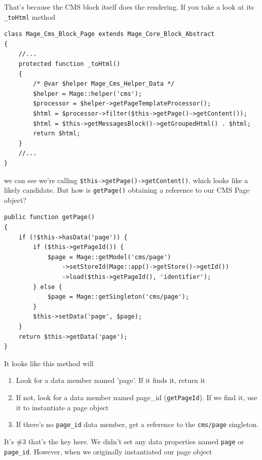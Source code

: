 \documentclass[oneside]{book}
\begin{document}
That's because the CMS block itself does the rendering.  If you take a look at its \footnotesize\texttt{\_toHtml} \normalsize  method

\begin{lstlisting}
class Mage_Cms_Block_Page extends Mage_Core_Block_Abstract
{
    //...
    protected function _toHtml()
    {
        /* @var $helper Mage_Cms_Helper_Data */
        $helper = Mage::helper('cms');
        $processor = $helper->getPageTemplateProcessor();
        $html = $processor->filter($this->getPage()->getContent());
        $html = $this->getMessagesBlock()->getGroupedHtml() . $html;
        return $html;
    }
    //...
}

\end{lstlisting}


we can see we're calling \footnotesize\texttt{\$this-\textgreater getPage()-\textgreater getContent()}\normalsize, which looks like a likely candidate.  But how is \footnotesize\texttt{getPage()} \normalsize  obtaining a reference to our CMS Page object?

\begin{lstlisting}
public function getPage()
{
    if (!$this->hasData('page')) {
        if ($this->getPageId()) {
            $page = Mage::getModel('cms/page')
                ->setStoreId(Mage::app()->getStore()->getId())
                ->load($this->getPageId(), 'identifier');
        } else {
            $page = Mage::getSingleton('cms/page');
        }
        $this->setData('page', $page);
    }
    return $this->getData('page');
}

\end{lstlisting}


It looks like this method will

\begin{enumerate}
\item Look for a data member named 'page'.  If it finds it, return it
\item If not, look for a data member named page\_id (\footnotesize\texttt{getPageId}\normalsize). If we find it, use it to instantiate a page object
\item If there's no \footnotesize\texttt{page\_id} \normalsize  data member, get a reference to the \footnotesize\texttt{cms/page} \normalsize  singleton.
\end{enumerate}


It's \#3 that's the key here.  We didn't set any data properties named \footnotesize\texttt{page} \normalsize  or \footnotesize\texttt{page\_id}\normalsize.  However, when we originally instantiated our page object
\end{document}
